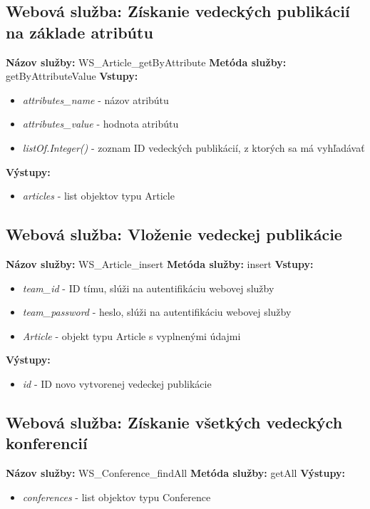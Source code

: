 \documentclass[10pt,oneside,slovak,a4paper]{article}
\begin{document}
\subsection{Webová služba: Získanie vedeckých publikácií na základe atribútu}
\textbf{Názov služby:} WS\_Article\_getByAttribute
\textbf{Metóda služby:} getByAttributeValue
\textbf{Vstupy:}
	\begin{itemize}
		\item \textit{attributes\_name} - názov atribútu
		\item \textit{attributes\_value} - hodnota atribútu
		\item \textit{listOf.Integer()} - zoznam ID vedeckých publikácií, z ktorých sa má vyhľadávať
	\end{itemize}
\textbf{Výstupy:}
	\begin{itemize}
		\item \textit{articles} - list objektov typu Article
	\end{itemize}
	
\subsection{Webová služba: Vloženie vedeckej publikácie}
\textbf{Názov služby:} WS\_Article\_insert
\textbf{Metóda služby:} insert
\textbf{Vstupy:}
	\begin{itemize}
		\item \textit{team\_id} - ID tímu, slúži na autentifikáciu webovej služby
		\item \textit{team\_password} - heslo, slúži na autentifikáciu webovej služby
		\item \textit{Article} - objekt typu Article s vyplnenými údajmi
	\end{itemize}
\textbf{Výstupy:}
	\begin{itemize}
		\item \textit{id} - ID novo vytvorenej vedeckej publikácie
	\end{itemize}
	
\subsection{Webová služba: Získanie všetkých vedeckých konferencií}
\textbf{Názov služby:} WS\_Conference\_findAll
\textbf{Metóda služby:} getAll
\textbf{Výstupy:}
	\begin{itemize}
		\item \textit{conferences} - list objektov typu Conference
	\end{itemize}
	
\end{document}
